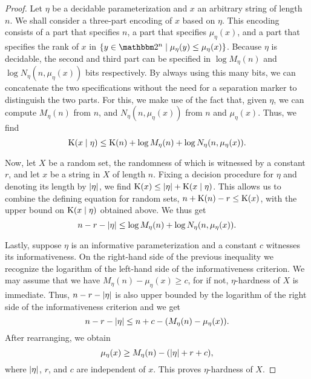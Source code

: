 \begin{proof}
  Let $\eta$ be a decidable parameterization and $x$ an arbitrary string of length $n$.
  We shall consider a three-part encoding of $x$ based on $\eta$.
  This encoding consists of a part that specifies $n$, a part that specifies $\mu_\eta(x)$, and a part that specifies the rank of $x$ in $\{y \in \binary^n \st \mu_\eta(y) \le \mu_\eta(x)\}$.
  Because $\eta$ is decidable, the second and third part can be specified in $\log M_\eta(n)$ and $\log N_\eta(n, \mu_\eta(x))$ bits respectively.
  By always using this many bits, we can concatenate the two specifications without the need for a separation marker to distinguish the two parts.
  For this, we make use of the fact that, given $\eta$, we can compute $M_\eta(n)$ from $n$, and $N_\eta(n, \mu_\eta(x))$ from $n$ and $\mu_\eta(x)$.
  Thus, we find
  \begin{equation*}
    \operatorname{K}(x {\;|\;} \eta) \le \operatorname{K}(n) + \log M_\eta(n) + \log N_\eta(n, \mu_\eta(x)).
  \end{equation*}

  Now, let $X$ be a random set, the randomness of which is witnessed by a constant $r$, and let $x$ be a string in $X$ of length $n$.
  Fixing a decision procedure for $\eta$ and denoting its length by ${\lvert\eta\rvert}$, we find $\operatorname{K}(x) \le {\lvert\eta\rvert} + \operatorname{K}(x {\;|\;} \eta)$.
  This allows us to combine the defining equation for random sets, $n + \operatorname{K}(n) - r \le \operatorname{K}(x)$, with the upper bound on $\operatorname{K}(x {\;|\;} \eta)$ obtained above.
  We thus get
  \begin{equation*}
    n - r - {\lvert\eta\rvert} \le \log M_\eta(n) + \log N_\eta(n, \mu_\eta(x)).
  \end{equation*}

  Lastly, suppose $\eta$ is an informative parameterization and a constant $c$ witnesses its informativeness.
  On the right-hand side of the previous inequality we recognize the logarithm of the left-hand side of the informativeness criterion.
  We may assume that we have $M_\eta(n) - \mu_\eta(x) \ge c$, for if not, $\eta$-hardness of $X$ is immediate.
  Thus, $n - r - {\lvert\eta\rvert}$ is also upper bounded by the logarithm of the right side of the informativeness criterion and we get
  \begin{equation*}
    n - r - {\lvert\eta\rvert} \le n + c - (M_\eta(n) - \mu_\eta(x)).
  \end{equation*}
  After rearranging, we obtain
  \begin{equation*}
    \mu_\eta(x) \ge M_\eta(n) - ({\lvert\eta\rvert} + r + c),
  \end{equation*}
  where ${\lvert\eta\rvert}$, $r$, and $c$ are independent of $x$.
  This proves $\eta$-hardness of $X$.
\end{proof}


